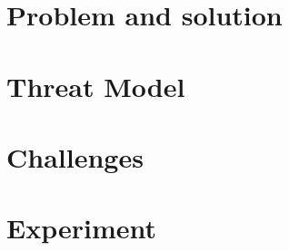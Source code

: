 \documentclass[conference]{IEEEtran}
\begin{document}
\section{Problem and solution}


\section{Threat Model}


\section{Challenges}


\section{Experiment}


\begin{thebibliography}{00}

\end{thebibliography}
\end{document}
